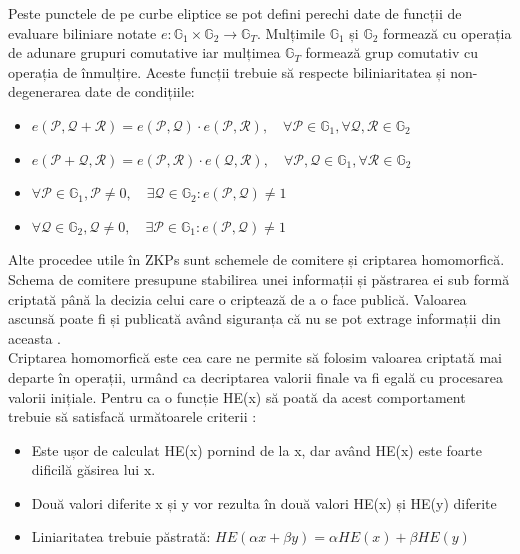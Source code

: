 Peste punctele de pe curbe eliptice se pot defini perechi date de funcții de evaluare biliniare notate $e: \mathbb{G}_1 \times \mathbb{G}_2 \rightarrow \mathbb{G}_T$. Mulțimile $\mathbb{G}_1$ și $\mathbb{G}_2$ formează cu operația de adunare grupuri comutative iar mulțimea $\mathbb{G}_T$ formează grup comutativ cu operația de înmulțire. Aceste funcții trebuie să respecte biliniaritatea și non-degenerarea date de condițiile:
\begin{itemize}
    \item $e(\mathcal{P},\mathcal{Q} + \mathcal{R}) = e(\mathcal{P},\mathcal{Q}) \cdot e(\mathcal{P},\mathcal{R}), \quad \forall \mathcal{P} \in \mathbb{G}_1, \forall \mathcal{Q},\mathcal{R} \in \mathbb{G}_2$
    \item $e(\mathcal{P}+\mathcal{Q},\mathcal{R}) = e(\mathcal{P},\mathcal{R}) \cdot e(\mathcal{Q},\mathcal{R}), \quad \forall \mathcal{P},\mathcal{Q} \in \mathbb{G}_1, \forall \mathcal{R} \in \mathbb{G}_2$
    \item $\forall \mathcal{P} \in \mathbb{G}_1, \mathcal{P} \neq 0,\quad \exists \mathcal{Q} \in \mathbb{G}_2: e(\mathcal{P},\mathcal{Q}) \neq 1$
    \item $\forall \mathcal{Q} \in \mathbb{G}_2, \mathcal{Q} \neq 0,\quad \exists \mathcal{P} \in \mathbb{G}_1: e(\mathcal{P},\mathcal{Q}) \neq 1$
\end{itemize}

\clearpage

Alte procedee utile în ZKPs sunt schemele de comitere și criptarea homomorfică.\\

Schema de comitere presupune stabilirea unei informații și păstrarea ei sub formă criptată până la decizia celui care o criptează de a o face publică. Valoarea ascunsă poate fi și publicată având siguranța că nu se pot extrage informații din aceasta \cite{ZKS_Crypto_Basic}. \\

Criptarea homomorfică este cea care ne permite să folosim valoarea criptată mai departe în operații, urmând ca decriptarea valorii finale va fi egală cu procesarea valorii inițiale. Pentru ca o funcție HE(x) să poată da acest comportament trebuie să satisfacă următoarele criterii \cite{ZKS_Crypto_Basic}:
\begin{itemize}
    \item Este ușor de calculat HE(x) pornind de la x, dar având HE(x) este foarte dificilă găsirea lui x.
    \item Două valori diferite x și y vor rezulta în două valori HE(x) și HE(y) diferite
    \item Liniaritatea trebuie păstrată: $HE(\alpha x + \beta y) = \alpha HE(x) + \beta HE(y)$
\end{itemize}

